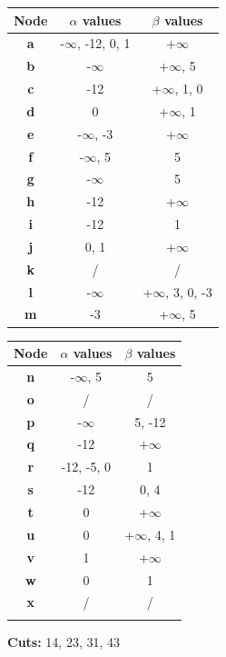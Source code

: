\documentclass[11pt,a4paper]{report}
\begin{document}
\begin{answers}[8cm]
      \begin{multicols}{2}
      \begin{tabular}{ccc}
      Node & $\alpha$ values & $\beta$ values\\
      \hline
      \textbf{a} & -$\infty$, -12, 0, 1 & +$\infty$ \\ %
      \textbf{b} & -$\infty$ & +$\infty$, 5 \\
      \textbf{c} & -12 & +$\infty$, 1, 0 \\
      \textbf{d} & 0 & +$\infty$, 1 \\
      \textbf{e} & -$\infty$, -3 & +$\infty$ \\
      \textbf{f} & -$\infty$, 5 & 5 \\
      \textbf{g} & -$\infty$ & 5 \\
      \textbf{h} & -12 & +$\infty$ \\
      \textbf{i} & -12 & 1 \\
      \textbf{j} & 0, 1 & +$\infty$ \\
      \textbf{k} & / & / \\
      \textbf{l} & -$\infty$ & +$\infty$, 3, 0, -3 \\
      \textbf{m} & -3 & +$\infty$, 5 \\ 
      \end{tabular}
      
      \begin{tabular}{ccc}
      Node & $\alpha$ values & $\beta$ values\\
      \hline
      \textbf{n} & -$\infty$, 5 & 5 \\
      \textbf{o} & / & / \\
      \textbf{p} & -$\infty$ & 5, -12 \\
      \textbf{q} & -12 & +$\infty$ \\
      \textbf{r} & -12, -5, 0 & 1 \\
      \textbf{s} & -12 & 0, 4 \\
      \textbf{t} & 0 & +$\infty$ \\
      \textbf{u} & 0 & +$\infty$, 4, 1 \\
      \textbf{v} & 1 & +$\infty$ \\
      \textbf{w} & 0 & 1 \\
      \textbf{x} & / & / \\
       &  &  \\
      \end{tabular}
      \end{multicols}
      
\textbf{Cuts:} 14, 23, 31, 43%
\end{answers}
\end{document}
